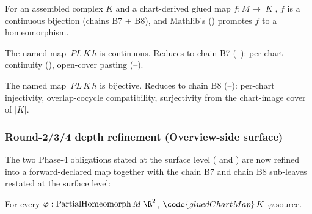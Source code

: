 \begin{lemma}
\label{lem:rado-pl-assembled-realisation-homeo}
For an assembled complex \(K\) and a chart-derived glued map
\(f : M \to |K|\), \(f\) is a continuous bijection (chains B7 + B8),
and Mathlib's 
() promotes \(f\) to a
homeomorphism.
\leanok
\end{lemma}

\begin{lemma}
\label{lem:rado-pl-glued-chart-map-continuous}
The named map \,\(PL\,K\,h\) is continuous.
Reduces to chain B7 (--): per-chart
continuity (), open-cover pasting
(--).
\leanok
\end{lemma}

\begin{lemma}
\label{lem:rado-pl-glued-chart-map-bijective}
The named map \,\(PL\,K\,h\) is bijective.
Reduces to chain B8 (--): per-chart
injectivity, overlap-cocycle compatibility, surjectivity from the
chart-image cover of \(|K|\).
\leanok
\end{lemma}

\subsubsection*{Round-2/3/4 depth refinement (Overview-side surface)}

The two Phase-4 obligations stated at the
 surface level
( and
) are now refined into a
forward-declared map  together with the chain
B7 and chain B8 sub-leaves restated at the surface level:

\begin{lemma}
\label{lem:rado-overview-glued-continuousOn-chart}
For every \(\varphi : \mathrm{PartialHomeomorph}\,M\,\R^{2}\),
 \(\code{gluedChartMap}\,K\) \(\varphi.\mathrm{source}\).
\leanok
\end{lemma}


